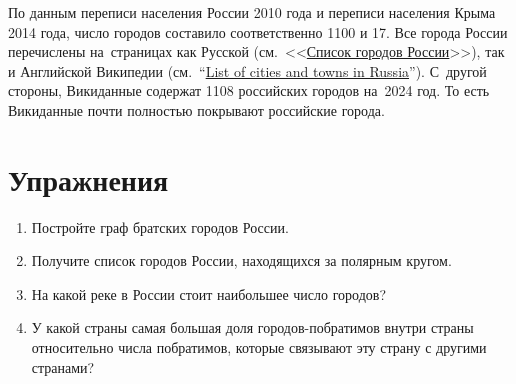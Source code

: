 По данным переписи населения России 2010 года %
и переписи населения Крыма 2014 года, число городов составило соответственно 1100 и 17. 
Все города России перечислены на~страницах 
как Русской 
    (см.~<<\href{https://ru.wikipedia.org/?curid=951219}{Список городов России}>>), 
так и Английской Википедии 
    (см.~``\href{https://en.wikipedia.org/?curid=171916}{List of cities and towns in Russia}'').
С~другой стороны, Викиданные содержат 1108 российских городов на~2024 год. То есть Викиданные почти полностью покрывают российские города. 

\section{Упражнения}

\begin{enumerate}
\item Постройте граф братских городов России.
\item Получите список городов России, находящихся за полярным кругом.
\item На какой реке в России стоит наибольшее число городов?
\item У какой страны самая большая доля городов-побратимов внутри страны относительно числа побратимов, которые связывают эту страну с другими странами?
\end{enumerate}
